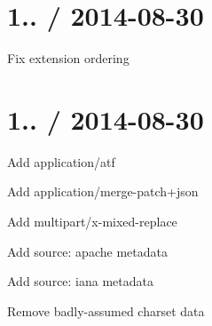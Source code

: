 \section*{1.. / 2014-\/08-\/30 }


\begin{DoxyItemize}
\item Fix extension ordering
\end{DoxyItemize}

\section*{1.. / 2014-\/08-\/30 }


\begin{DoxyItemize}
\item Add {\ttfamily application/atf}
\item Add {\ttfamily application/merge-\/patch+json}
\item Add {\ttfamily multipart/x-\/mixed-\/replace}
\item Add {\ttfamily source\+: \textquotesingle{}apache\textquotesingle{}} metadata
\item Add {\ttfamily source\+: \textquotesingle{}iana\textquotesingle{}} metadata
\item Remove badly-\/assumed charset data 
\end{DoxyItemize}